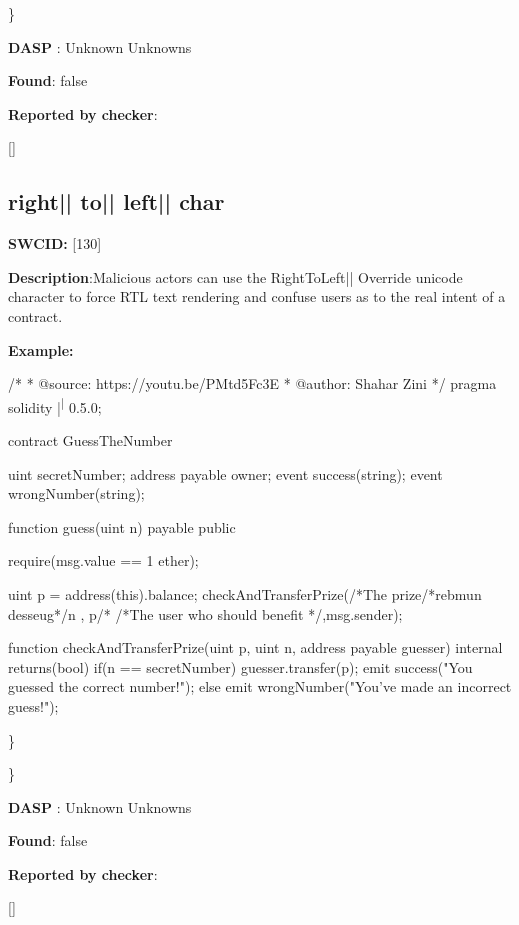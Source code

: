 \documentclass{article}
\begin{document}
\} 

\textbf{DASP} : Unknown Unknowns

\textbf{Found}: false

\textbf{Reported by checker}: 
\begin{ffcode} 

[]
\end{ffcode} 
\subsection{right{|\textunderscore| }to{|\textunderscore| }left{|\textunderscore| }char} 
\textbf{SWC{\textunderscore }ID:} [130]

\textbf{Description}:Malicious actors can use the Right{\textendash}To{\textendash}Left|\textendash| Override unicode character to force RTL text rendering and confuse users as to the real intent of a contract.


\textbf{Example:} 
\begin{ffcode} 

/*
* @source: https://youtu.be/P\textunderscore Mtd5Fc\textunderscore 3E
* @author: Shahar Zini
*/
pragma solidity |\textsuperscript| 0.5.0;

contract GuessTheNumber
{
    uint \textunderscore secretNumber;
    address payable \textunderscore owner;
    event success(string);
event wrongNumber(string);

    function guess(uint n) payable public
    {
        require(msg.value == 1 ether);

        uint p = address(this).balance;
        checkAndTransferPrize(/*The prize/*rebmun desseug*/n , p/*
                /*The user who should benefit */,msg.sender);
    }

    function checkAndTransferPrize(uint p, uint n, address payable guesser) internal returns(bool)
    {
        if(n == \textunderscore secretNumber)
        {
            guesser.transfer(p);
            emit success("You guessed the correct number!");
        }
        else
        {
            emit wrongNumber("You've made an incorrect guess!");
        }
    }
  }

\end{ffcode} 
\} 

\} 

\textbf{DASP} : Unknown Unknowns

\textbf{Found}: false

\textbf{Reported by checker}: 
\begin{ffcode} 

[]
\end{ffcode} 
\end{document}
